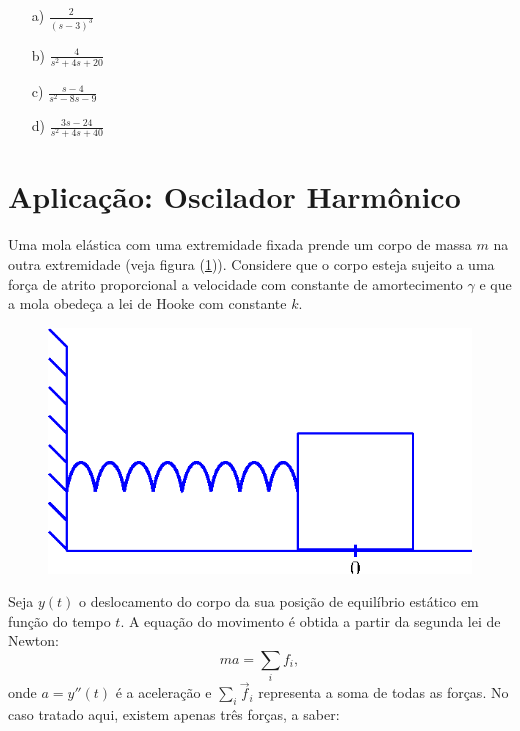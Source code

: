 \begin{resp}
\begin{itemize}
   \item[a)] $\displaystyle \frac{2}{(s-3)^3}$
  \item[b)] $\displaystyle \frac{4}{s^2 +4s +20}$
  \item[c)] $\displaystyle \frac{s-4}{s^2 - 8s - 9}$
  \item[d)] $\displaystyle \frac{3s -24}{s^2 +4s + 40}$
\end{itemize}
  \end{resp}
\section{Aplicação: Oscilador Harmônico}
Uma mola elástica com uma extremidade fixada prende um corpo de massa $m$ na outra extremidade (veja figura (\ref{massa-mola})). Considere que o corpo esteja sujeito a uma força de atrito proporcional a velocidade com constante de amortecimento $\gamma$ e que a mola obedeça a lei de Hooke com constante $k$.
\begin{figure}[!ht]
\begin{center}

\includegraphics{cap_trans_int/pics/figura_1}\end{center}
\caption{\label{massa-mola}}
\end{figure}
Seja $y(t)$ o deslocamento do corpo da sua posição de equilíbrio estático em função do tempo $t$. A equação do movimento é obtida a partir da segunda lei de Newton:
\begin{equation}
ma=\sum_i f_i,
\end{equation}
onde $a=y''(t)$ é a aceleração e $\sum_i \vec{f}_i$ representa a soma de todas as forças. No caso tratado aqui, existem apenas três forças, a saber:
